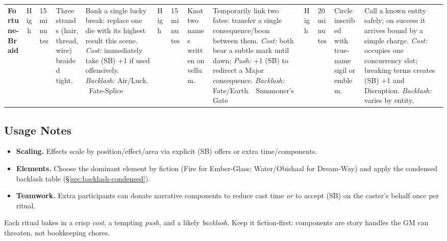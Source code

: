 \begin{table}[h]
\begin{tabularx}{\linewidth}{>{\bfseries}l c l X X}
Fortune-Braid & High & 15 minutes & Three strands (hair, thread, wire) braided tight. & Bank a single lucky break: replace one die with its highest result this scene. \emph{Cost:} immediately take (SB) +1 if used offensively. \emph{Backlash:} Air/Luck. \
Fate-Splice & High & 15 minutes & Knot two names written on vellum. & Temporarily link two fates: transfer a single consequence/boon between them. \emph{Cost:} both bear a subtle mark until dawn; \emph{Push:} +1 (SB) to redirect a Major consequence. \emph{Backlash:} Fate/Earth. \
Summoner’s Gate & High & 20 minutes & Circle inscribed with true-name sigil or emblem. & Call a known entity safely; on success it arrives bound by a simple charge. \emph{Cost:} occupies one concurrency slot; breaking terms creates (SB) +1 and Disruption. \emph{Backlash:} varies by entity. \
\bottomrule
\end{tabularx}
\end{table}

\subsection*{Usage Notes}\label{subsec:ritual-usage}
\begin{itemize}
\item \textbf{Scaling.} Effects scale by position/effect/area via explicit (SB) offers or extra time/components.
\item \textbf{Elements.} Choose the dominant element by fiction (Fire for Ember-Glass; Water/Obishaal for Dream-Way) and apply the condensed backlash table (\S\ref{sec:backlash-condensed}).
\item \textbf{Teamwork.} Extra participants can donate narrative components to reduce cast time \emph{or} to accept (SB) on the caster’s behalf once per ritual.
\end{itemize}

\begin{tcolorbox}[title={Design Intent},colback=gray!5,colframe=black]
Each ritual bakes in a crisp \emph{cost}, a tempting \emph{push}, and a likely \emph{backlash}. Keep it fiction-first: components are story handles the GM can threaten, not bookkeeping chores.\end{tcolorbox}
